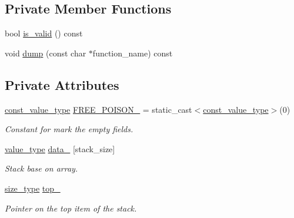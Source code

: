 \subsection*{Private Member Functions}
\begin{DoxyCompactItemize}
\item 
bool \hyperlink{classstk_1_1stack__t_a6c1813c8dc347f0cc9ab94a6e120d743}{is\+\_\+valid} () const
\item 
void \hyperlink{classstk_1_1stack__t_a3dd66fcfd99c93c63cdab500bbf5a7e8}{dump} (const char $\ast$function\+\_\+name) const
\end{DoxyCompactItemize}
\subsection*{Private Attributes}
\begin{DoxyCompactItemize}
\item 
\mbox{\label{classstk_1_1stack__t_a34489e147dc7052c6ee4eaa70c31c009}} 
\hyperlink{classstk_1_1stack__t_a27d586bc06e0faf30a2a980cd8ffd125}{const\+\_\+value\+\_\+type} \hyperlink{classstk_1_1stack__t_a34489e147dc7052c6ee4eaa70c31c009}{F\+R\+E\+E\+\_\+\+P\+O\+I\+S\+O\+N\+\_\+} = static\+\_\+cast$<$\hyperlink{classstk_1_1stack__t_a27d586bc06e0faf30a2a980cd8ffd125}{const\+\_\+value\+\_\+type}$>$(0)
\begin{DoxyCompactList}\small\item\em Constant for mark the empty fields. \end{DoxyCompactList}\item 
\mbox{\label{classstk_1_1stack__t_a740287c74a7e188220ef94e4dbd5a3ea}} 
\hyperlink{classstk_1_1stack__t_a05d1586fa8257268f0c1ade7ffc4588e}{value\+\_\+type} \hyperlink{classstk_1_1stack__t_a740287c74a7e188220ef94e4dbd5a3ea}{data\+\_\+} \mbox{[}stack\+\_\+size\mbox{]}
\begin{DoxyCompactList}\small\item\em Stack base on array. \end{DoxyCompactList}\item 
\mbox{\label{classstk_1_1stack__t_a9c23414b1fa07a11c14f2abb029ee676}} 
\hyperlink{classstk_1_1stack__t_ade199c494a8e4455f76cc04faf138ed8}{size\+\_\+type} \hyperlink{classstk_1_1stack__t_a9c23414b1fa07a11c14f2abb029ee676}{top\+\_\+}
\begin{DoxyCompactList}\small\item\em Pointer on the top item of the stack. \end{DoxyCompactList}\end{DoxyCompactItemize}


